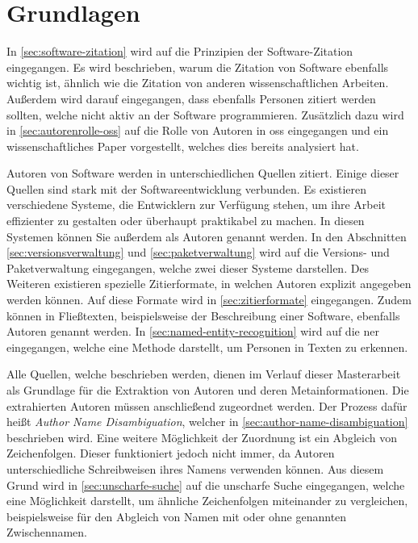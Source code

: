 \chapter{Grundlagen}
\label{chap:grundlagen}
In \autoref{sec:software-zitation} wird auf die Prinzipien der Software-Zitation eingegangen.
Es wird beschrieben, warum die Zitation von Software ebenfalls wichtig ist, ähnlich wie die Zitation von anderen wissenschaftlichen Arbeiten.
Außerdem wird darauf eingegangen, dass ebenfalls Personen zitiert werden sollten, welche nicht aktiv an der Software programmieren.
Zusätzlich dazu wird in \autoref{sec:autorenrolle-oss} auf die Rolle von Autoren in \gls{oss} eingegangen und ein wissenschaftliches Paper vorgestellt, welches dies bereits analysiert hat.

Autoren von Software werden in unterschiedlichen Quellen zitiert.
Einige dieser Quellen sind stark mit der Softwareentwicklung verbunden.
Es existieren verschiedene Systeme, die Entwicklern zur Verfügung stehen, um ihre Arbeit effizienter zu gestalten oder überhaupt praktikabel zu machen.
In diesen Systemen können Sie außerdem als Autoren genannt werden.
In den Abschnitten \ref{sec:versionsverwaltung} und \ref{sec:paketverwaltung} wird auf die Versions- und Paketverwaltung eingegangen, welche zwei dieser Systeme darstellen.
Des Weiteren existieren spezielle Zitierformate, in welchen Autoren explizit angegeben werden können.
Auf diese Formate wird in \autoref{sec:zitierformate} eingegangen.
Zudem können in Fließtexten, beispielsweise der Beschreibung einer Software, ebenfalls Autoren genannt werden.
In \autoref{sec:named-entity-recognition} wird auf die \gls{ner} eingegangen, welche eine Methode darstellt, um Personen in Texten zu erkennen.

Alle Quellen, welche beschrieben werden, dienen im Verlauf dieser Masterarbeit als Grundlage für die Extraktion von Autoren und deren Metainformationen.
Die extrahierten Autoren müssen anschließend zugeordnet werden.
Der Prozess dafür heißt \emph{Author Name Disambiguation}, welcher in \autoref{sec:author-name-disambiguation} beschrieben wird.
Eine weitere Möglichkeit der Zuordnung ist ein Abgleich von Zeichenfolgen.
Dieser funktioniert jedoch nicht immer, da Autoren unterschiedliche Schreibweisen ihres Namens verwenden können.
Aus diesem Grund wird in \autoref{sec:unscharfe-suche} auf die unscharfe Suche eingegangen, welche eine Möglichkeit darstellt, um ähnliche Zeichenfolgen miteinander zu vergleichen, beispielsweise für den Abgleich von Namen mit oder ohne genannten Zwischennamen.








